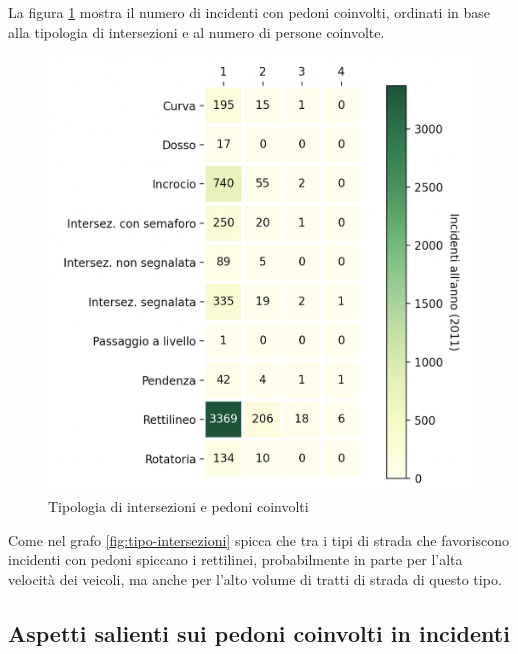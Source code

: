 \documentclass[a4paper]{report}
\begin{document}
La figura \ref{fig:pedoni-intersezioni} mostra il numero di incidenti con pedoni coinvolti, 
ordinati in base alla tipologia di intersezioni e al numero di persone coinvolte.

\begin{figure}
    \includegraphics[width=\linewidth]{../src/incidenti/incidenti_senza_coords/pedoni/pedoni_incroci.png}
    \caption{Tipologia di intersezioni e pedoni coinvolti}
    \label{fig:pedoni-intersezioni}
\end{figure}

Come nel grafo \ref{fig:tipo-intersezioni} spicca che 
tra i tipi di strada che favoriscono incidenti con pedoni spiccano i rettilinei, 
probabilmente in parte per l'alta velocità dei veicoli, ma anche per l'alto volume di
tratti di strada di questo tipo.


\subsection{Aspetti salienti sui pedoni coinvolti in incidenti}
\end{document}
